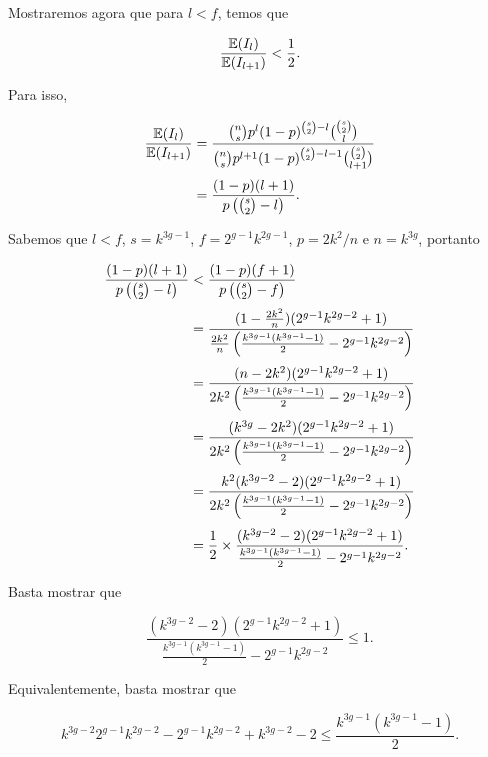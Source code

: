 Mostraremos agora que para $l < f$, temos que

\[\frac{\mathbb{E}(I_l)}{\mathbb{E}(I_{l+1})} < \frac{1}{2}.\]

Para isso, 

\begin{equation*}
\setlength{\jot}{6pt}
\begin{aligned}
\frac{\bbe(I_l)}{\bbe(I_{l+1})} &= \frac{\binom{n}{s}p^l (1-p)^{\binom{s}{2}-l} \binom{\binom{s}{2}}{l}}{\binom{n}{s}p^{l+1} (1-p)^{\binom{s}{2}-l-1} \binom{\binom{s}{2}}{l+1}} \\
&= \frac{(1-p)(l+1)}{p\left(\binom{s}{2}-l\right)}.
\end{aligned}
\end{equation*}

Sabemos que $l < f$, $s = k^{3g-1}$, $f = 2^{g-1}k^{2g-1}$, $p = 2k^2/n$ e $n = k^{3g}$, portanto

\begin{equation*}
\setlength{\jot}{6pt}
\begin{aligned}
\frac{(1-p)(l+1)}{p\left(\binom{s}{2}-l\right)} &< \frac{(1-p)(f+1)}{p\left(\binom{s}{2}-f\right)} \\
&= \frac{(1-\frac{2k^2}{n})(2^{g-1}k^{2g-2}+1)}{\frac{2k^2}{n}\left(\frac{k^{3g-1}(k^{3g-1}-1)}{2}-2^{g-1}k^{2g-2}\right)} \\
&= \frac{(n-2k^2)(2^{g-1}k^{2g-2}+1)}{2k^2\left(\frac{k^{3g-1}(k^{3g-1}-1)}{2}-2^{g-1}k^{2g-2}\right)} \\
&= \frac{(k^{3g}-2k^2)(2^{g-1}k^{2g-2}+1)}{2k^2\left(\frac{k^{3g-1}(k^{3g-1}-1)}{2}-2^{g-1}k^{2g-2}\right)} \\
&= \frac{k^2(k^{3g-2}-2)(2^{g-1}k^{2g-2}+1)}{2k^2\left(\frac{k^{3g-1}(k^{3g-1}-1)}{2}-2^{g-1}k^{2g-2}\right)} \\
&= \frac{1}{2} \times \frac{(k^{3g-2}-2)(2^{g-1}k^{2g-2}+1)}{\frac{k^{3g-1}(k^{3g-1}-1)}{2}-2^{g-1}k^{2g-2}}.
\end{aligned}
\end{equation*}

Basta mostrar que 

\[\frac{(k^{3g-2}-2)(2^{g-1}k^{2g-2}+1)}{\frac{k^{3g-1}(k^{3g-1}-1)}{2}-2^{g-1}k^{2g-2}} \leq 1.\]

Equivalentemente, basta mostrar que %


\[k^{3g-2}2^{g-1}k^{2g-2}-2^{g-1}k^{2g-2} + k^{3g-2}-2 \leq \frac{k^{3g-1}(k^{3g-1}-1)}{2}.\]

